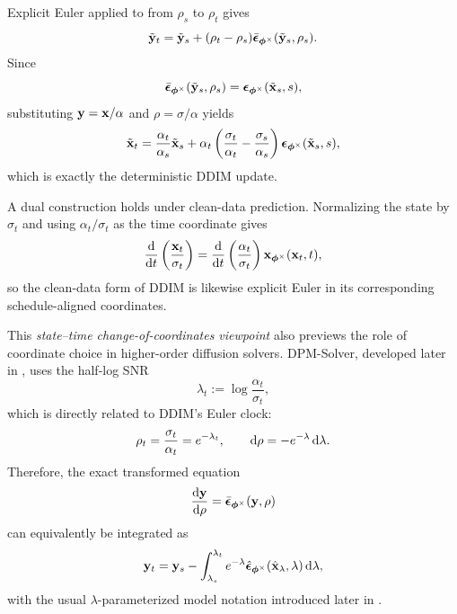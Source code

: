 Explicit Euler applied to  from
$\rho_s$ to $\rho_t$ gives
\[
\tilde{{\mathbf{y}}}_t
=
\tilde{{\mathbf{y}}}_s
+
(\rho_t-\rho_s)
\bar{{\bm{\epsilon}}}_{\bm{\phi}^\times}(\tilde{{\mathbf{y}}}_s,\rho_s).
\]
Since
\[
\bar{{\bm{\epsilon}}}_{\bm{\phi}^\times}(\tilde{{\mathbf{y}}}_s,\rho_s)
=
{\bm{\epsilon}}_{\bm{\phi}^\times}(\tilde{{\mathbf{x}}}_s,s),
\]
substituting
${\mathbf{y}}={\mathbf{x}}/\alpha$ and $\rho=\sigma/\alpha$ yields
\[
\tilde{{\mathbf{x}}}_t
=
\frac{\alpha_t}{\alpha_s}\tilde{{\mathbf{x}}}_s
+
\alpha_t
\left(
\frac{\sigma_t}{\alpha_t}
-
\frac{\sigma_s}{\alpha_s}
\right)
{\bm{\epsilon}}_{\bm{\phi}^\times}(\tilde{{\mathbf{x}}}_s,s),
\]
which is exactly the deterministic DDIM update.


A dual construction holds under clean-data prediction. Normalizing the state by $\sigma_t$ and using $\alpha_t/\sigma_t$ as the time coordinate gives 
\[
\frac{\mathop{}\!\mathrm{d}}{\mathop{}\!\mathrm{d} t} \left( \frac{{\mathbf{x}}_t}{\sigma_t} \right) = \frac{\mathop{}\!\mathrm{d}}{\mathop{}\!\mathrm{d} t} \left( \frac{\alpha_t}{\sigma_t} \right) {\mathbf{x}}_{\bm{\phi}^\times}({\mathbf{x}}_t,t), 
\] 
so the clean-data form of DDIM is likewise explicit Euler in its corresponding schedule-aligned coordinates.

This \emph{state--time change-of-coordinates viewpoint} also previews the role
of coordinate choice in higher-order diffusion solvers. DPM-Solver, developed
later in , uses the half-log SNR
\[
\lambda_t
:=
\log\frac{\alpha_t}{\sigma_t},
\]
which is directly related to DDIM's Euler clock:
\[
\rho_t
=
\frac{\sigma_t}{\alpha_t}
=
e^{-\lambda_t},
\qquad
\mathop{}\!\mathrm{d}\rho
=
-e^{-\lambda}\mathop{}\!\mathrm{d}\lambda.
\]
Therefore, the exact transformed equation
\[
\frac{\mathop{}\!\mathrm{d}{\mathbf{y}}}{\mathop{}\!\mathrm{d}\rho}
=
\bar{{\bm{\epsilon}}}_{\bm{\phi}^\times}({\mathbf{y}},\rho)
\]
can equivalently be integrated as
\[
{\mathbf{y}}_t
=
{\mathbf{y}}_s
-
\int_{\lambda_s}^{\lambda_t}
e^{-\lambda}
\hat{{\bm{\epsilon}}}_{\bm{\phi}^\times}
(\hat{{\mathbf{x}}}_\lambda,\lambda)
\mathop{}\!\mathrm{d}\lambda,
\]
with the usual $\lambda$-parameterized model notation introduced later in
.

